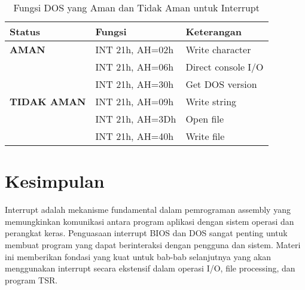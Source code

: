 \documentclass[../main.tex]{subfiles}
\begin{document}
            \begin{table}[H]
                \centering
                \caption{Fungsi DOS yang Aman dan Tidak Aman untuk Interrupt}
                \begin{tabular}{|p{3cm}|p{3cm}|p{7cm}|}
                    \hline
                    \textbf{Status} & \textbf{Fungsi} & \textbf{Keterangan} \\
                    \hline
                    \textbf{AMAN} & INT 21h, AH=02h & Write character \\
                    \hline
                    & INT 21h, AH=06h & Direct console I/O \\
                    \hline
                    & INT 21h, AH=30h & Get DOS version \\
                    \hline
                    \textbf{TIDAK AMAN} & INT 21h, AH=09h & Write string \\
                    \hline
                    & INT 21h, AH=3Dh & Open file \\
                    \hline
                    & INT 21h, AH=40h & Write file \\
                    \hline
                \end{tabular}
            \end{table}

    \section{Kesimpulan}
        Interrupt adalah mekanisme fundamental dalam pemrograman assembly yang memungkinkan komunikasi antara program aplikasi dengan sistem operasi dan perangkat keras. Penguasaan interrupt BIOS dan DOS sangat penting untuk membuat program yang dapat berinteraksi dengan pengguna dan sistem. Materi ini memberikan fondasi yang kuat untuk bab-bab selanjutnya yang akan menggunakan interrupt secara ekstensif dalam operasi I/O, file processing, dan program TSR.
\end{document}
